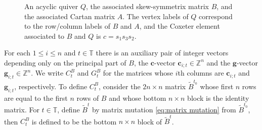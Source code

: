 \documentclass[12pt]{amsart}
\newcommand{\sayHW}[1]{\say[HW]{\color{violet}{\bf HW:}\;#1}}
\newcommand{\sayDR}[1]{\say[DR]{\color{red}{\bf DR:}\;#1}}
\newcommand{\cA}{\mathcal{A}}
\newcommand{\TT}{\mathbb{T}}
\newcommand{\ZZ}{\mathbb{Z}}
\newcommand{\kk}{\Bbbk}%
\newcommand{\bfc}{\mathbf{c}}
\newcommand{\bfg}{\mathbf{g}}
\theoremstyle{remark}
\numberwithin{equation}{section}
\begin{document}

\begin{figure}
\centering
{}
\caption{An acyclic quiver $Q$, the associated skew-symmetrix matrix $B$, and the associated Cartan matrix $A$. The vertex labels of $Q$ correspond to the row/column labels of $B$ and $A$, and the Coxeter element associated to $B$ and $Q$ is $c = s_1 s_3 s_2$.}\label{fig:matrices}
\end{figure}  

For each $1 \leq i \leq n$ and $t \in\TT$ there is an auxiliary pair of integer vectors depending only on the principal part of $B$, the $\bfc$-vector $\bfc_{i;t} \in \ZZ^n$ and the $\bfg$-vector $\bfg_{i;t} \in \ZZ^n$. We write $C_t^B$ and $G_t^B$ for the matrices whose $i$th columns are $\bfc_{i;t}$ and $\bfg_{i;t}$, respectively. To define $C_t^B$, consider the $2n \times n$ matrix $\tilde B^{t_0}$ whose first $n$ rows are equal to the first $n$ rows of $B$ and whose bottom $n \times n$ block is the identity matrix. 
For $t\in\TT$, define $\tilde B^t$ by matrix mutation \eqref{eq:matrix mutation} from $\tilde B^{t_0}$, then $C_t^B$ is defined to be the bottom $n \times n$ block of $\tilde B^t$. 
\end{document}

